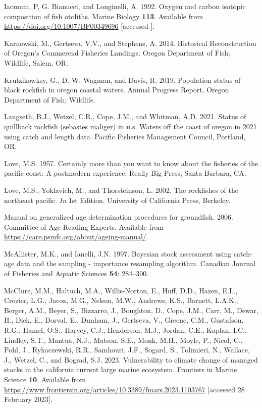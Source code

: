 \documentclass[11pt,
  english,
  letterpaper,
]{article}
\newlength{\cslhangindent}
\newenvironment{CSLReferences}[2] %
 {%
  \setlength{\parindent}{0pt}
  \ifodd #1 \everypar{\setlength{\hangindent}{\cslhangindent}}\ignorespaces\fi
  \ifnum #2 > 0
  \setlength{\parskip}{#2\baselineskip}
  \fi
 }%
 {}
\begin{document}
\begin{CSLReferences}{1}{0}
\leavevmode{}%
Iacumin, P, G. Bianucci, and Longinelli, A. 1992. Oxygen and carbon isotopic composition of fish otoliths. Marine Biology \textbf{113}. Available from \url{https://doi.org/10.1007/BF00349696} {[}accessed {]}.

\leavevmode{}%
Karnowski, M., Gertseva, V.V., and Stephens, A. 2014. Historical {Reconstruction} of {Oregon}'s {Commercial} {Fisheries} {Landings}. Oregon Department of Fish; Wildlife, Salem, OR.

\leavevmode{}%
Krutzikowksy, G., D. W. Wagman, and Davis, R. 2019. Population status of black rockfish in oregon coastal waters. Annual Progress Report, Oregon Department of Fish; Wildlife.

\leavevmode{}%
Langseth, B.J., Wetzel, C.R., Cope, J.M., and Whitman, A.D. 2021. Status of quillback rockfish (sebastes maliger) in u.s. Waters off the coast of oregon in 2021 using catch and length data. Pacific Fisheries Management Council, Portland, {OR}.

\leavevmode{}%
Love, M.S. 1957. Certainly more than you want to know about the fisheries of the pacific coast: A postmodern experience. Really Big Press, Santa Barbara, CA.

\leavevmode{}%
Love, M.S., Yoklavich, M., and Thorsteinson, L. 2002. The rockfishes of the northeast pacific. \emph{In} 1st Edition. University of California Press, Berkeley.

\leavevmode{}%
Manual on generalized age determination procedures for groundfish. 2006. Committee of Age Reading Experts. Available from \url{https://care.psmfc.org/about/ageing-manual/}.

\leavevmode{}%
McAllister, M.K., and Ianelli, J.N. 1997. Bayesian stock assessment using catch-age data and the sampling - importance resampling algorithm. Canadian Journal of Fisheries and Aquatic Sciences \textbf{54}: 284--300.

\leavevmode{}%
McClure, M.M., Haltuch, M.A., Willis-Norton, E., Huff, D.D., Hazen, E.L., Crozier, L.G., Jacox, M.G., Nelson, M.W., Andrews, K.S., Barnett, L.A.K., Berger, A.M., Beyer, S., Bizzarro, J., Boughton, D., Cope, J.M., Carr, M., Dewar, H., Dick, E., Dorval, E., Dunham, J., Gertseva, V., Greene, C.M., Gustafson, R.G., Hamel, O.S., Harvey, C.J., Henderson, M.J., Jordan, C.E., Kaplan, I.C., Lindley, S.T., Mantua, N.J., Matson, S.E., Monk, M.H., Moyle, P., Nicol, C., Pohl, J., Rykaczewski, R.R., Samhouri, J.F., Sogard, S., Tolimieri, N., Wallace, J., Wetzel, C., and Bograd, S.J. 2023. Vulnerability to climate change of managed stocks in the california current large marine ecosystem. Frontiers in Marine Science \textbf{10}. Available from \url{https://www.frontiersin.org/articles/10.3389/fmars.2023.1103767} {[}accessed 28 February 2023{]}.


\end{CSLReferences}
\end{document}
